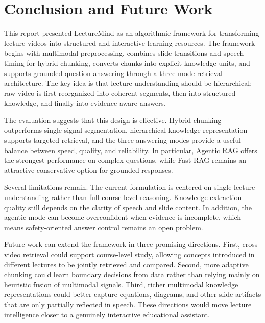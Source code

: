 \section{Conclusion and Future Work}

This report presented LectureMind as an algorithmic framework for transforming lecture videos into structured and interactive learning resources. The framework begins with multimodal preprocessing, combines slide transitions and speech timing for hybrid chunking, converts chunks into explicit knowledge units, and supports grounded question answering through a three-mode retrieval architecture. The key idea is that lecture understanding should be hierarchical: raw video is first reorganized into coherent segments, then into structured knowledge, and finally into evidence-aware answers.

The evaluation suggests that this design is effective. Hybrid chunking outperforms single-signal segmentation, hierarchical knowledge representation supports targeted retrieval, and the three answering modes provide a useful balance between speed, quality, and reliability. In particular, Agentic RAG offers the strongest performance on complex questions, while Fast RAG remains an attractive conservative option for grounded responses.

Several limitations remain. The current formulation is centered on single-lecture understanding rather than full course-level reasoning. Knowledge extraction quality still depends on the clarity of speech and slide content. In addition, the agentic mode can become overconfident when evidence is incomplete, which means safety-oriented answer control remains an open problem.

Future work can extend the framework in three promising directions. First, cross-video retrieval could support course-level study, allowing concepts introduced in different lectures to be jointly retrieved and compared. Second, more adaptive chunking could learn boundary decisions from data rather than relying mainly on heuristic fusion of multimodal signals. Third, richer multimodal knowledge representations could better capture equations, diagrams, and other slide artifacts that are only partially reflected in speech. These directions would move lecture intelligence closer to a genuinely interactive educational assistant.
